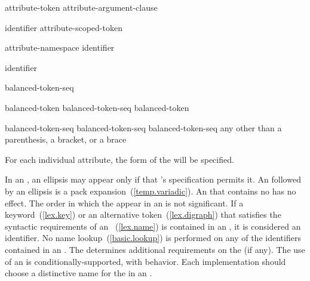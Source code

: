\begin{bnf}
\br
    attribute-token attribute-argument-clause\opt
\end{bnf}

\begin{bnf}
\br
    identifier\br
    attribute-scoped-token
\end{bnf}

\begin{bnf}
\br
    attribute-namespace \terminal{::} identifier
\end{bnf}

\begin{bnf}
\br
    identifier
\end{bnf}

\begin{bnf}
\br
    \terminal{(} balanced-token-seq\opt{} \terminal{)}
\end{bnf}

\begin{bnf}
\br
    balanced-token\br
    balanced-token-seq balanced-token
\end{bnf}

\begin{bnf}
\br
    \terminal{(} balanced-token-seq\opt{} \terminal{)}\br
    \terminal{[} balanced-token-seq\opt{} \terminal{]}\br
    \terminal{\{} balanced-token-seq\opt{} \terminal{\}}\br
    \textnormal{any  other than a parenthesis, a bracket, or a brace}
\end{bnf}

\pnum
\enternote For each individual attribute, the form of the
 will be specified. \exitnote

\pnum
In an , an ellipsis may appear only if that
's specification permits it. An  followed
by an ellipsis is a pack expansion~(\ref{temp.variadic}).
An  that contains no  has no
effect. The order in which the  appear in an
 is not significant. If a
keyword~(\ref{lex.key})
or an alternative token~(\ref{lex.digraph}) that satisfies the syntactic requirements
of an ~(\ref{lex.name}) is
contained in
an , it is considered an identifier. No name
lookup~(\ref{basic.lookup}) is performed on any of the identifiers contained in an
. The  determines additional
requirements on the  (if any). The use of an
 is conditionally-supported, with
 behavior. \enternote Each implementation
should choose a distinctive name for the  in an
. \exitnote

